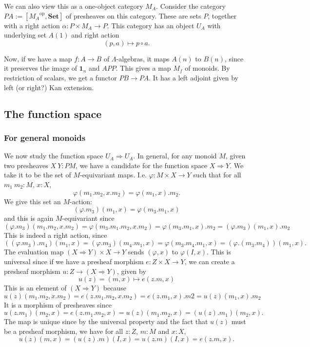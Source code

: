 \documentclass{amsbook}
\newcommand{\Catb}[1]{\mathbf{#1}}
\newcommand{\SET}{\Catb{Set}}
\newcommand{\op}[1]{\ensuremath{{#1}^\text{op}}}
\theoremstyle{definition}
\begin{document}
  We can also view this as a one-object category $ M_A $. Consider the category $ P A := [\op{M_A}, \SET] $ of presheaves on this category. These are sets $ P $, together with a right action $ \alpha: P \times M_A \to P $. This category has an object $ U_A $ with underlying set $ A(1) $ and right action
  \[ (p, a) \mapsto p \circ a. \]

  Now, if we have a map $ f: A \to B $ of $ \Lambda $-algebras, it maps $ A(n) $ to $ B(n) $, since it preserves the image of $ \mathbf 1_n $ and $ APP $. This gives a map $ M_f $ of monoids. By restriction of scalars, we get a functor $ PB \to PA $. It has a left adjoint given by left (or right?) Kan extension.

  \subsection{The function space}
  \subsubsection{For general monoids}
  We now study the function space $ U_A \Rightarrow U_A $.
  In general, for any monoid $ M $, given two presheaves $ X\ Y: PM $, we have a candidate for the function space $ X \Rightarrow Y $. We take it to be the set of $ M $-equivariant maps. I.e. $ \varphi: M \times X \to Y $ such that for all $ m_1\ m_2: M $, $ x: X $,
  \[ \varphi(m_1 . m_2, x . m_2) = \varphi(m_1, x) . m_2. \]
  We give this set an $ M $-action:
  \[ (\varphi . m_3)(m_1, x) = \varphi(m_3 . m_1, x) \]
  and this is again $ M $-equivariant since
  \[ (\varphi . m_3)(m_1 . m_2, x . m_2) = \varphi(m_3 . m_1 . m_2, x . m_2) = \varphi(m_3 . m_1, x) . m_2 = (\varphi . m_3)(m_1, x) . m_2 \]
  This is indeed a right action, since
  \[ ((\varphi . m_3) . m_4)(m_1, x) = (\varphi . m_3)(m_4 . m_1, x) = \varphi(m_3 . m_4 . m_1, x) = (\varphi . (m_3 . m_4))(m_1, x). \]
  The evaluation map $ (X \Rightarrow Y) \times X \to Y $ sends $ (\varphi, x) $ to $ \varphi(I, x) $. This is universal since if we have a presheaf morphism $ e: Z \times X \to Y $, we can create a presheaf morphism $ u: Z \to (X \Rightarrow Y) $, given by
  \[ u(z) = (m, x) \mapsto e(z . m, x) \]
  This is an element of $ (X \Rightarrow Y) $ because
  \[ u(z)(m_1 . m_2, x . m_2) = e(z . m_1 . m_2, x . m_2) = e(z . m_1, x) . m
  2 = u(z)(m_1, x) . m_2 \]
  It is a morphism of presheaves since
  \[ u(z . m_1)(m_2, x) = e(z . m_1 . m_2, x) = u(z)(m_1 . m_2, x) = (u(z) . m_1)(m_2, x). \]
  The map is unique since by the universal property and the fact that $ u(z) $ must be a presheaf morphism, we have for all $ z: Z $, $ m: M $ and $ x: X $,
  \[ u(z)(m, x) = (u(z) . m)(I, x) = u(z . m)(I, x) = e(z . m, x). \]
\end{document}
